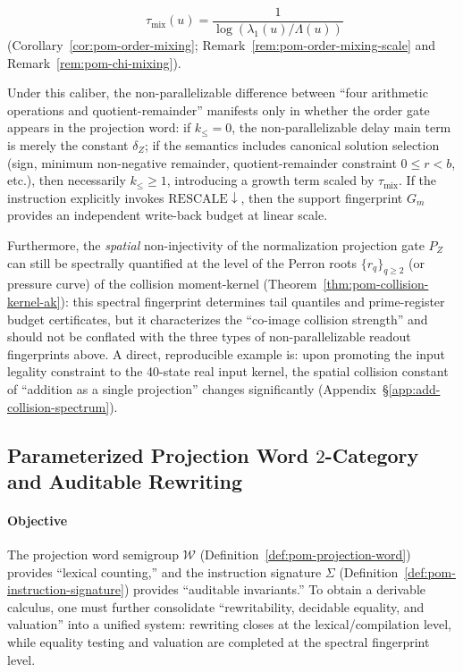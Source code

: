 \begin{remark}
\begin{itemize}
\[  \qquad
  \tau_{\mathrm{mix}}(u)=\frac{1}{\log(\lambda_1(u)/\Lambda(u))}
  \]
  (Corollary~\ref{cor:pom-order-mixing}; Remark~\ref{rem:pom-order-mixing-scale} and Remark~\ref{rem:pom-chi-mixing}).
\end{itemize}
Under this caliber, the non-parallelizable difference between ``four arithmetic operations and quotient-remainder'' manifests only in whether the order gate appears in the projection word: if \(k_{\le}=0\), the non-parallelizable delay main term is merely the constant \(\delta_Z\);
if the semantics includes canonical solution selection (sign, minimum non-negative remainder, quotient-remainder constraint \(0\le r<b\), etc.), then necessarily \(k_{\le}\ge 1\), introducing a growth term scaled by \(\tau_{\mathrm{mix}}\).
If the instruction explicitly invokes \(\mathrm{RESCALE}\downarrow\), then the support fingerprint \(G_m\) provides an independent write-back budget at linear scale.
\par
Furthermore, the \emph{spatial} non-injectivity of the normalization projection gate \(P_Z\) can still be spectrally quantified at the level of the Perron roots \(\{r_q\}_{q\ge 2}\) (or pressure curve) of the collision moment-kernel (Theorem~\ref{thm:pom-collision-kernel-ak}): this spectral fingerprint determines tail quantiles and prime-register budget certificates, but it characterizes the ``co-image collision strength'' and should not be conflated with the three types of non-parallelizable readout fingerprints above.
A direct, reproducible example is: upon promoting the input legality constraint to the 40-state real input kernel, the spatial collision constant of ``addition as a single projection'' changes significantly (Appendix~\S\ref{app:add-collision-spectrum}).
\end{remark}

\subsection{Parameterized Projection Word \texorpdfstring{$2$}{2}-Category and Auditable Rewriting}\label{subsec:pom-2cat-rewrite}
\paragraph{Objective}
The projection word semigroup $\mathcal W$ (Definition~\ref{def:pom-projection-word}) provides ``lexical counting,'' and the instruction signature $\Sigma$ (Definition~\ref{def:pom-instruction-signature}) provides ``auditable invariants.''
To obtain a derivable calculus, one must further consolidate ``rewritability, decidable equality, and valuation'' into a unified system: rewriting closes at the lexical/compilation level, while equality testing and valuation are completed at the spectral fingerprint level.

